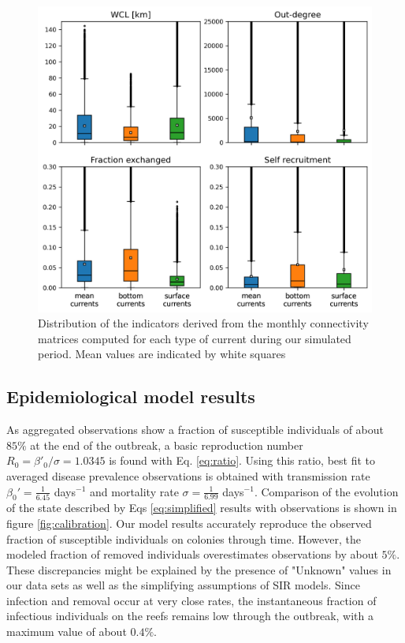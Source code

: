 \documentclass[utf8]{frontiersSCNS}
\begin{document}
\begin{figure}
    \centering
    \includegraphics[width=.8\textwidth]{figures/connect_paper.png}
    \caption{Distribution of the indicators derived from the monthly connectivity matrices computed for each type of current during our simulated period. Mean values are indicated by white squares}
    \label{fig:connect}
\end{figure}

\subsection{Epidemiological model results}

As aggregated observations show a fraction of susceptible individuals of about $85\%$ at the end of the outbreak, a basic reproduction number $R_0=\beta'_0/\sigma=1.0345$ is found with Eq. \ref{eq:ratio}. Using this ratio, best fit to averaged disease prevalence observations is obtained with transmission rate $\beta_0'=\frac{1}{6.45}$ days$^{-1}$ and mortality rate $\sigma=\frac{1}{6.99}$ days$^{-1}$. Comparison of the evolution of the state described by Eqs \ref{eq:simplified} results with observations is shown in figure \ref{fig:calibration}. Our model results accurately reproduce the observed fraction of susceptible individuals on colonies through time. However, the modeled fraction of removed individuals overestimates observations by about $5\%$. These discrepancies might be explained by the presence of "Unknown" values in our data sets as well as the simplifying assumptions of SIR models. Since infection and removal occur at very close rates, the instantaneous fraction of infectious individuals on the reefs remains low through the outbreak, with a maximum value of about $0.4\%$.
\end{document}
